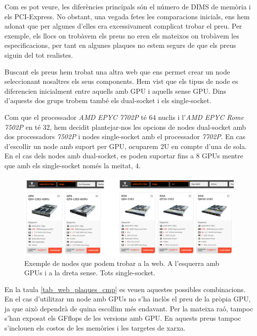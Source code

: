 Com es pot veure, les diferències principals són el número de DIMS de memòria i els PCI-Express. No obstant, una vegada fetes les comparacions inicials, ens hem adonat que per algunes d'elles era excessivament complicat trobar el preu. Per exemple, els llocs on trobàvem els preus no eren els mateixos on trobàvem les especificacions, per tant en algunes plaques no estem segurs de que els preus siguin del tot realistes.

Buscant els preus hem trobat una altra web \cite{webnodes} que ens permet crear un node seleccionant nosaltres els seus components. Hem vist que els tipus de node es diferencien inicialment entre aquells amb GPU i aquells sense GPU. Dins d'aquests dos grups trobem també els dual-socket i els single-socket.

Com que el processador \textit{AMD EPYC 7702P} té 64 nuclis i l'\textit{AMD EPYC Rome 7502P} en té 32, hem decidit plantejar-nos les opcions de nodes dual-socket amb dos processadors \textit{7502P} i nodes single-socket amb el processador \textit{7702P}. En cas d'escollir un node amb suport per GPU, ocuparem 2U en compte d'una de sola. En el cas dels nodes amb dual-socket, es poden suportar fins a 8 GPUs mentre que amb els single-socket només la meitat, 4.

\begin{figure}[H]
    \centering
    \includegraphics[width=\textwidth]{img/webnodes.png}
    \caption{Exemple de nodes que podem trobar a la web. A l'esquerra amb GPUs i a la dreta sense. Tots single-socket.}
\end{figure}

En la taula \ref{tab_web_plaques_cmp} es veuen aquestes possibles combinacions. En el cas d'utilitzar un node amb GPUs no s'ha inclòs el preu de la pròpia GPU, ja que això dependrà de quina escollim més endavant. Per la mateixa raó, tampoc s'han exposat els GFflops de les versions amb GPU. En aquests preus tampoc s'inclouen els costos de les memòries i les targetes de xarxa.

